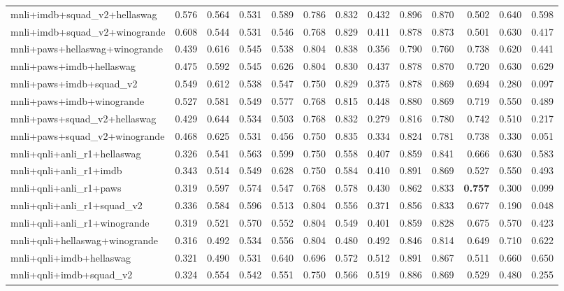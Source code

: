 \begin{table}[t]
\begin{tabular}{lrrrrrrrrrrrr}
    mnli+imdb+squad\_v2+hellaswag & 0.576 & 0.564 & 0.531 & 0.589 & 0.786 & 0.832 & 0.432 & 0.896 & 0.870 & 0.502 & 0.640 & 0.598 \\
    mnli+imdb+squad\_v2+winogrande & 0.608 & 0.544 & 0.531 & 0.546 & 0.768 & 0.829 & 0.411 & 0.878 & 0.873 & 0.501 & 0.630 & 0.417 \\
    mnli+paws+hellaswag+winogrande & 0.439 & 0.616 & 0.545 & 0.538 & 0.804 & 0.838 & 0.356 & 0.790 & 0.760 & 0.738 & 0.620 & 0.441 \\
    mnli+paws+imdb+hellaswag & 0.475 & 0.592 & 0.545 & 0.626 & 0.804 & 0.830 & 0.437 & 0.878 & 0.870 & 0.720 & 0.630 & 0.629 \\
    mnli+paws+imdb+squad\_v2 & 0.549 & 0.612 & 0.538 & 0.547 & 0.750 & 0.829 & 0.375 & 0.878 & 0.869 & 0.694 & 0.280 & 0.097 \\
    mnli+paws+imdb+winogrande & 0.527 & 0.581 & 0.549 & 0.577 & 0.768 & 0.815 & 0.448 & 0.880 & 0.869 & 0.719 & 0.550 & 0.489 \\
    mnli+paws+squad\_v2+hellaswag & 0.429 & 0.644 & 0.534 & 0.503 & 0.768 & 0.832 & 0.279 & 0.816 & 0.780 & 0.742 & 0.510 & 0.217 \\
    mnli+paws+squad\_v2+winogrande & 0.468 & 0.625 & 0.531 & 0.456 & 0.750 & 0.835 & 0.334 & 0.824 & 0.781 & 0.738 & 0.330 & 0.051 \\
    mnli+qnli+anli\_r1+hellaswag & 0.326 & 0.541 & 0.563 & 0.599 & 0.750 & 0.558 & 0.407 & 0.859 & 0.841 & 0.666 & 0.630 & 0.583 \\
    mnli+qnli+anli\_r1+imdb & 0.343 & 0.514 & 0.549 & 0.628 & 0.750 & 0.584 & 0.410 & 0.891 & 0.869 & 0.527 & 0.550 & 0.493 \\
    mnli+qnli+anli\_r1+paws & 0.319 & 0.597 & 0.574 & 0.547 & 0.768 & 0.578 & 0.430 & 0.862 & 0.833 & \textbf{0.757} & 0.300 & 0.099 \\
    mnli+qnli+anli\_r1+squad\_v2 & 0.336 & 0.584 & 0.596 & 0.513 & 0.804 & 0.556 & 0.371 & 0.856 & 0.833 & 0.677 & 0.190 & 0.048 \\
    mnli+qnli+anli\_r1+winogrande & 0.319 & 0.521 & 0.570 & 0.552 & 0.804 & 0.549 & 0.401 & 0.859 & 0.828 & 0.675 & 0.570 & 0.423 \\
    mnli+qnli+hellaswag+winogrande & 0.316 & 0.492 & 0.534 & 0.556 & 0.804 & 0.480 & 0.492 & 0.846 & 0.814 & 0.649 & 0.710 & 0.622 \\
    mnli+qnli+imdb+hellaswag & 0.321 & 0.490 & 0.531 & 0.640 & 0.696 & 0.572 & 0.512 & 0.891 & 0.867 & 0.511 & 0.660 & 0.650 \\
    mnli+qnli+imdb+squad\_v2 & 0.324 & 0.554 & 0.542 & 0.551 & 0.750 & 0.566 & 0.519 & 0.886 & 0.869 & 0.529 & 0.480 & 0.255 \\

\end{tabular}
\end{table}
